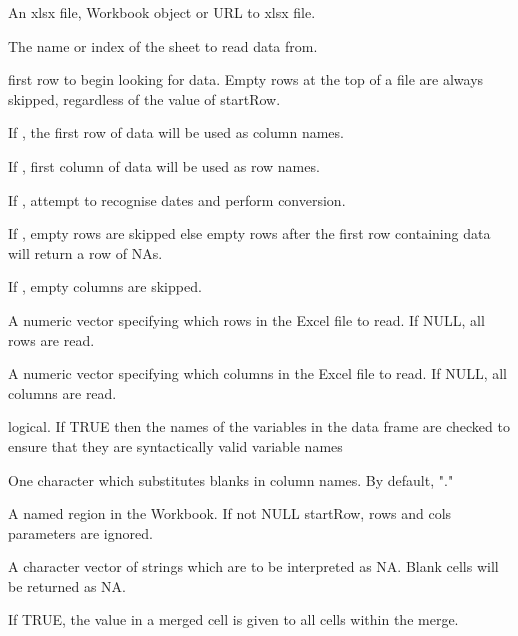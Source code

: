 \documentclass[letterpaper]{book}
\begin{document}
\begin{Arguments}
\begin{ldescription}
\item[\code{xlsxFile}] An xlsx file, Workbook object or URL to xlsx file.

\item[\code{sheet}] The name or index of the sheet to read data from.

\item[\code{startRow}] first row to begin looking for data.  Empty rows at the top of a file are always skipped,
regardless of the value of startRow.

\item[\code{colNames}] If , the first row of data will be used as column names.

\item[\code{rowNames}] If , first column of data will be used as row names.

\item[\code{detectDates}] If , attempt to recognise dates and perform conversion.

\item[\code{skipEmptyRows}] If , empty rows are skipped else empty rows after the first row containing data
will return a row of NAs.

\item[\code{skipEmptyCols}] If , empty columns are skipped.

\item[\code{rows}] A numeric vector specifying which rows in the Excel file to read.
If NULL, all rows are read.

\item[\code{cols}] A numeric vector specifying which columns in the Excel file to read.
If NULL, all columns are read.

\item[\code{check.names}] logical. If TRUE then the names of the variables in the data frame
are checked to ensure that they are syntactically valid variable names

\item[\code{sep.names}] One character which substitutes blanks in column names. By default, "."

\item[\code{namedRegion}] A named region in the Workbook. If not NULL startRow, rows and cols parameters are ignored.

\item[\code{na.strings}] A character vector of strings which are to be interpreted as NA. Blank cells will be returned as NA.

\item[\code{fillMergedCells}] If TRUE, the value in a merged cell is given to all cells within the merge.
\end{ldescription}
\end{Arguments}
\end{document}
